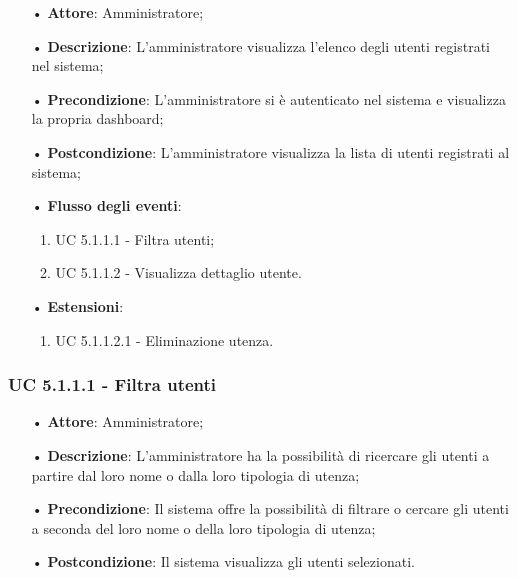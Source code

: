 \begin{itemize}
\item[•] \textbf{Attore}: Amministratore;

\item[•] \textbf{Descrizione}: L'amministratore visualizza l'elenco degli utenti registrati nel sistema;

\item[•] \textbf{Precondizione}: L'amministratore si è autenticato nel sistema e visualizza la propria dashboard;

\item[•] \textbf{Postcondizione}: L'amministratore visualizza la lista di utenti registrati al sistema; 

\item[•] \textbf{Flusso degli eventi}:


\begin{enumerate}

\item UC 5.1.1.1 - Filtra utenti;
\item UC 5.1.1.2 - Visualizza dettaglio utente.

\end{enumerate}

	\item[•] \textbf{Estensioni}:	
\begin{enumerate}
	\item UC 5.1.1.2.1 - Eliminazione utenza.
\end{enumerate}

\end{itemize}

\subsubsection{UC 5.1.1.1 - Filtra utenti}
\begin{itemize}

\item[•] \textbf{Attore}: Amministratore;
\item[•] \textbf{Descrizione}: L'amministratore ha la possibilità di ricercare gli utenti a partire dal loro nome o dalla loro tipologia di utenza;
\item[•] \textbf{Precondizione}: Il sistema offre la possibilità di filtrare o cercare gli utenti a seconda del loro nome o della loro tipologia di utenza;
\item[•] \textbf{Postcondizione}: Il sistema visualizza gli utenti selezionati.

\end{itemize}

